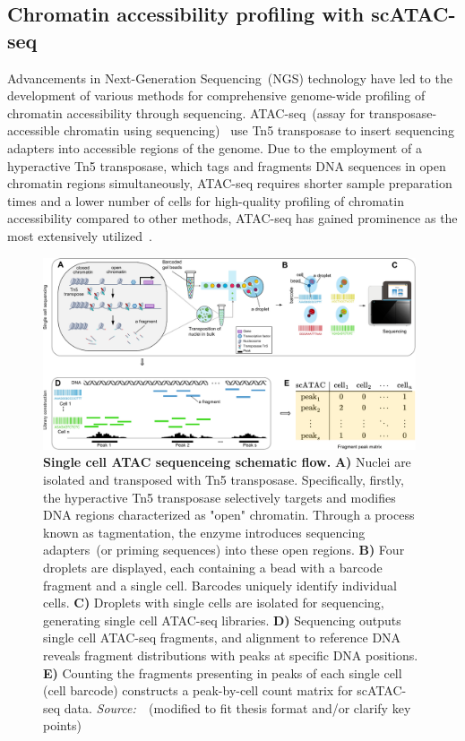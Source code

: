 \subsection{Chromatin accessibility profiling with scATAC-seq}
\label{background:sec1:scATAC}

Advancements in Next-Generation Sequencing~(NGS) technology have led to the development of various methods for comprehensive genome-wide profiling of chromatin accessibility through sequencing. ATAC-seq~(assay for transposase-accessible chromatin using sequencing)~\citep{buenrostro2013atacseq} use Tn5 transposase to insert sequencing adapters into accessible regions of the genome. Due to the employment of a hyperactive Tn5 transposase, which tags and fragments DNA sequences in open chromatin regions simultaneously, ATAC-seq requires shorter sample preparation times and a lower number of cells for high-quality profiling of chromatin accessibility compared to other methods, ATAC-seq has gained prominence as the most extensively utilized~\citep{minnoye2021chromatin}.

\begin{figure}[!ht]
	\centering
	\includegraphics[width=0.98\textwidth]{scATAC-seq/fig}
	\vspace{0.1cm}
	\caption[Single cell ATAC sequenceing schematic flow.]{ \textbf{Single cell ATAC sequenceing schematic flow.} \textbf{A)} Nuclei are isolated and transposed with Tn5 transposase. Specifically, firstly, the hyperactive Tn5 transposase selectively targets and modifies DNA regions characterized as "open" chromatin. Through a process known as tagmentation, the enzyme introduces sequencing adapters~(or priming sequences) into these open regions. \textbf{B)} Four droplets are displayed, each containing a bead with a barcode fragment and a single cell. Barcodes uniquely identify individual cells. \textbf{C)} Droplets with single cells are isolated for sequencing, generating single cell ATAC-seq libraries. \textbf{D)} Sequencing outputs single cell ATAC-seq fragments, and alignment to reference DNA reveals fragment distributions with peaks at specific DNA positions. \textbf{E)} Counting the fragments presenting in peaks of each single cell (cell barcode) constructs a peak-by-cell count matrix for scATAC-seq data. \emph{Source:~\cite{yan2020reads}}~(modified to fit thesis format and/or clarify key points)}
	\label{fig:scATAC-seq}
\end{figure}

